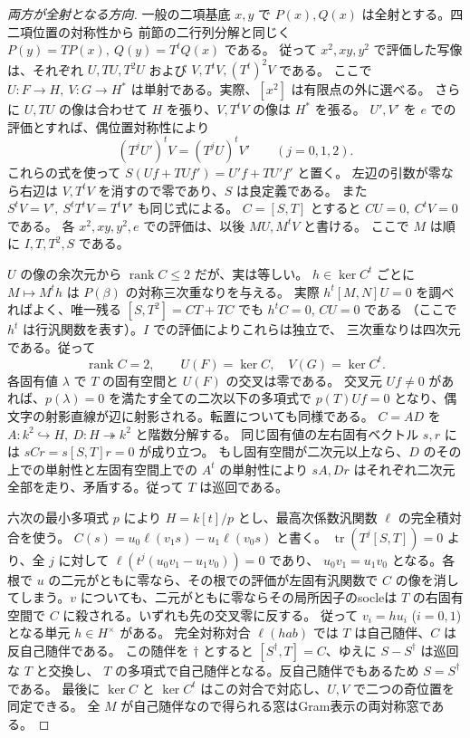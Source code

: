 \begin{proof}[両方が全射となる方向]
一般の二項基底 $x,y$ で $P(x),Q(x)$ は全射とする。四二項位置の対称性から
前節の二行列分解と同じく $P(y)=TP(x),\ Q(y)=T^tQ(x)$ である。
従って $x^2,xy,y^2$ で評価した写像は、それぞれ
$U,TU,T^2U$ および $V,T^tV,(T^t)^2 V$ である。
ここで $U:F\to H,\ V:G\to H^*$ は単射である。実際、$[x^2]$ は有限点の外に選べる。
さらに $U,TU$ の像は合わせて $H$ を張り、$V,T^tV$ の像は $H^*$ を張る。
$U',V'$ を $e$ での評価とすれば、偶位置対称性により
\[
 (T^jU')^t V=(T^j U)^t V'\qquad(j=0,1,2).
\]
これらの式を使って $S(Uf+TUf')=U'f+TU'f'$ と置く。
左辺の引数が零なら右辺は $V,T^t V$ を消すので零であり、$S$ は良定義である。
また $S^t V=V',\ S^t T^t V=T^t V'$ も同じ式による。
$C=[S,T]$ とすると $CU=0,\ C^t V=0$ である。
各 $x^2,xy,y^2,e$ での評価は、以後 $M U,M^t V$ と書ける。
ここで $M$ は順に $I,T,T^2,S$ である。

$U$ の像の余次元から $\operatorname{rank} C\le2$ だが、実は等しい。
$h\in\ker C^t$ ごとに $M\mapsto M^t h$ は $P(\beta)$ の対称三次重なりを与える。
実際 $h^t[M,N]U=0$ を調べればよく、唯一残る $[S,T^2]=CT+TC$ でも $h^t C=0$, $CU=0$ である
（ここで $h^t$ は行汎関数を表す）。$I$ での評価によりこれらは独立で、
三次重なりは四次元である。従って
\[
 \operatorname{rank} C=2,\qquad U(F)=\ker C,\quad V(G)=\ker C^t .
\]
各固有値 $\lambda$ で $T$ の固有空間と $U(F)$ の交叉は零である。
交叉元 $Uf\ne0$ があれば、$p(\lambda)=0$ を満たす全ての二次以下の多項式で
$p(T)Uf=0$ となり、偶文字の射影直線が辺に射影される。転置についても同様である。
$C=A D$ を $A:k^2\hookrightarrow H,\ D:H\twoheadrightarrow k^2$ と階数分解する。
同じ固有値の左右固有ベクトル $s,r$ には $sCr=s[S,T]r=0$ が成り立つ。
もし固有空間が二次元以上なら、$D$ のその上での単射性と左固有空間上での $A^t$ の単射性により
$sA,Dr$ はそれぞれ二次元全部を走り、矛盾する。従って $T$ は巡回である。

六次の最小多項式 $p$ により $H=k[t]/p$ とし、最高次係数汎関数 $\ell$ の完全積対合を使う。
$C(s)=u_0\ell(v_1 s)-u_1\ell(v_0s)$ と書く。
$\operatorname{tr}(T^j [S,T])=0$ より、全 $j$ に対して $\ell(t^j(u_0v_1-u_1v_0))=0$ であり、
$u_0v_1=u_1v_0$ となる。各根で $u$ の二元がともに零なら、その根での評価が左固有汎関数で
$C$ の像を消してしまう。$v$ についても、二元がともに零ならその局所因子のsocleは
$T$ の右固有空間で $C$ に殺される。いずれも先の交叉零に反する。
従って $v_i=h u_i$ ($i=0,1$) となる単元 $h\in H^\times$ がある。
完全対称対合 $\ell(h a b)$ では $T$ は自己随伴、$C$ は反自己随伴である。
この随伴を $\dagger$ とすると $[S^\dagger,T]=C$、ゆえに $S-S^\dagger$ は巡回な $T$ と交換し、
$T$ の多項式で自己随伴となる。反自己随伴でもあるため $S=S^\dagger$ である。
最後に $\ker C$ と $\ker C^t$ はこの対合で対応し、$U,V$ で二つの奇位置を同定できる。
全 $M$ が自己随伴なので得られる窓はGram表示の両対称窓である。
\end{proof}

